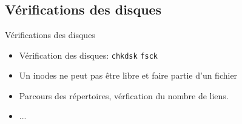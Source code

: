 \section{\sectitle}
\begin{frame}[containsverbatim]{\sectitle}
\def\subsectitle{Vérifications des disques}
\subsection{\subsectitle}
\begin{block}{\subsectitle}
\begin{itemize}
    \item Vérification des disques: \verb+chkdsk+ \verb+fsck+
    \item Un inodes ne peut pas être libre et faire partie d'un fichier
    \item Parcours des répertoires, vérfication du nombre de liens.
    \item ...
\end{itemize}
\end{block}
\end{frame}


